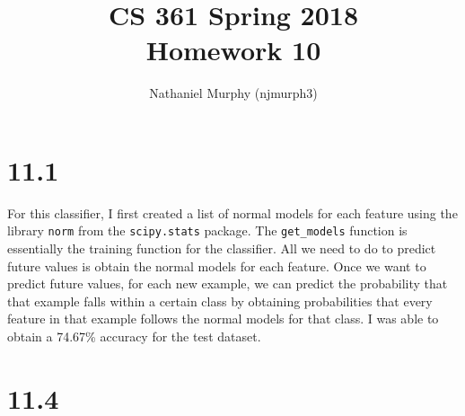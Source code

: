 \documentclass[11pt]{article}
\title{\textbf{CS 361 Spring 2018\\Homework 10}}
\author{Nathaniel Murphy (njmurph3)}
\date{}
\begin{document}
\maketitle
\section*{11.1}
For this classifier, I first created a list of normal models for each feature using the library \texttt{norm} from the \texttt{scipy.stats} package. The \texttt{get\_models} function is essentially the training function for the classifier. All we need to do to predict future values is obtain the normal models for each feature. Once we want to predict future values, for each new example, we can predict the probability that that example falls within a certain class by obtaining probabilities that every feature in that example follows the normal models for that class. I was able to obtain a 74.67\% accuracy for the test dataset.
\section*{11.4}
\end{document}

